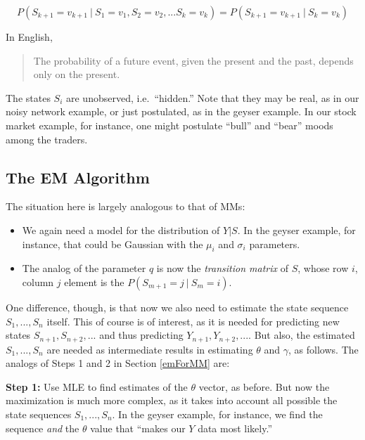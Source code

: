 \documentclass[11pt]{article}
\begin{document}
\begin{equation}
P(S_{k+1} = v_{k+1} ~|~ S_1 = v_1, S_2 = v_2, ...  S_k = v_k) =
P(S_{k+1} = v_{k+1} ~|~ S_k = v_k) 
\end{equation}

In English,

\begin{quote}
The probability of a future event, given the present and the past,
depends only on the present.
\end{quote}

The states $S_i$ are unobserved, i.e.\ ``hidden.''  Note that they 
may be real, as in our noisy network example, or just postulated, as in
the geyser example.  In our stock market example, for instance,
one might postulate ``bull'' and ``bear'' moods among the traders.

\subsection{The EM Algorithm}

The situation here is largely analogous to that of MMs:  

\begin{itemize}

\item We again need a model for the distribution of $Y | S$.  In the
geyser example, for instance, that could be Gaussian with the
$\mu_i$ and $\sigma_i$ parameters.

\item The analog of the parameter $q$ is now the \textit{transition
matrix} of $S$, whose row $i$, column $j$ element is the $P(S_{m+1} = j
~|~ S_m = i)$.

\end{itemize} 

One difference, though, is that now we also need to estimate the state
sequence $S_1,...,S_n$ itself.  This of course is of interest, as it is
needed for predicting new states $S_{n+1}, S_{n+2},...$ and thus
predicting $Y_{n+1}, Y_{n+2},...$.  But also, the estimated
$S_1,...,S_n$ are needed as intermediate results in estimating $\theta$
and $\gamma$, as follows.  The analogs of Steps 1 and 2 in Section
\ref{emForMM} are:

\textbf{Step 1:} Use MLE to find estimates of the $\theta$ vector, as
before.  But now the maximization is much more complex, as it takes into
account all possible the state sequences $S_1,...,S_n$.  In the geyser
example, for instance, we find the sequence \textit{and} the $\theta$
value that ``makes our $Y$ data most likely.''
\end{document}

